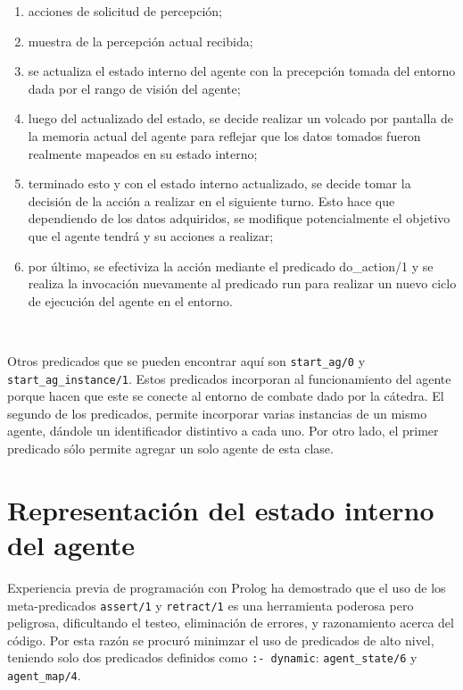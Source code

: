 \documentclass[a4paper,12pt]{report}
\begin{document}
\begin{enumerate}
\item acciones de solicitud de percepci\'{o}n;
\item muestra de la percepci\'{o}n actual recibida;
\item se actualiza el estado interno del agente con la precepci\'{o}n tomada del entorno dada por 
      el rango de visi\'{o}n del agente;
\item luego del actualizado del estado, se decide realizar un volcado por pantalla de la memoria 
      actual del agente para reflejar que los datos tomados fueron realmente mapeados en su estado 
      interno;
\item terminado esto y con el estado interno actualizado, se decide tomar la decisi\'{o}n de la 
      acci\'{o}n a realizar en el siguiente turno. 
      Esto hace que dependiendo de los datos adquiridos, se modifique potencialmente el objetivo 
      que el agente tendr\'{a} y su acciones a realizar;
\item por último, se efectiviza la acci\'{o}n mediante el predicado do\_action/1 y se realiza la 
      invocaci\'{o}n nuevamente al predicado run para realizar un nuevo ciclo de ejecuci\'{o}n del 
      agente en el entorno.
\end{enumerate}

\ 

Otros predicados que se pueden encontrar aqu\'{i} son \texttt{start\_ag/0} y 
\texttt{start\_ag\_instance/1}. 
Estos predicados incorporan al funcionamiento del agente porque hacen que este se conecte al 
entorno de combate dado por la c\'{a}tedra. 
El segundo de los predicados, permite incorporar varias instancias de un mismo agente, d\'{a}ndole 
un identificador distintivo a cada uno. 
Por otro lado, el primer predicado s\'{o}lo permite agregar un solo agente de esta clase.

\chapter{Representaci\'{o}n del estado interno del agente}

Experiencia previa de programaci\'{o}n con Prolog ha demostrado que el uso de los meta-predicados 
\texttt{assert/1} y \texttt{retract/1} es una herramienta poderosa pero peligrosa, dificultando el 
testeo, eliminaci\'{o}n de errores, y razonamiento acerca del c\'{o}digo. 
Por esta raz\'{o}n se procur\'{o} minimzar el uso de predicados de alto nivel, teniendo solo dos 
predicados definidos como \texttt{:- dynamic}: \texttt{agent\_state/6} y \texttt{agent\_map/4}.
\end{document}
